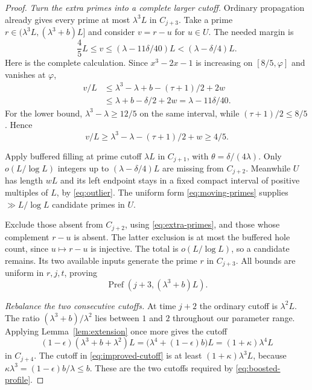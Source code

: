 \documentclass[11pt,letterpaper]{article}
\numberwithin{equation}{section}
\theoremstyle{definition}
\theoremstyle{remark}
\DeclareMathOperator{\Pref}{Pref}
\newcommand{\ph}{\varphi}
\begin{document}
\begin{proof}
\emph{Turn the extra primes into a complete larger cutoff.}
Ordinary propagation already gives every prime at most $\lambda^3L$
in $C_{j+3}$. Take a prime
$r\in(\lambda^3L,(\lambda^3+b)L]$ and consider $v=r-u$ for $u\in U$.
The needed margin is
\begin{equation}\label{eq:complement-margin}
 \frac45L\le v\le(\lambda-11\delta/40)L
       <(\lambda-\delta/4)L.
\end{equation}
Here is the complete calculation. Since $x^3-2x-1$ is increasing on
$[8/5,\ph]$ and vanishes at $\ph$,
\begin{align*}
 v/L
 &\le\lambda^3-\lambda+b-(\tau+1)/2+2w\\
 &\le\lambda+b-\delta/2+2w
 =\lambda-11\delta/40.
\end{align*}
For the lower bound, $\lambda^3-\lambda\ge12/5$ on the same interval,
while $(\tau+1)/2\le8/5$. Hence
\[
 v/L\ge\lambda^3-\lambda-(\tau+1)/2+w\ge4/5.
\]

Apply buffered filling at prime cutoff $\lambda L$ in $C_{j+1}$, with
$\theta=\delta/(4\lambda)$. Only $o(L/\log L)$ integers up to
$(\lambda-\delta/4)L$ are missing from $C_{j+2}$.
Meanwhile $U$ has length $wL$ and its left endpoint stays in a fixed
compact interval of positive multiples of $L$, by \eqref{eq:outlier}.
The uniform form \eqref{eq:moving-primes} supplies $\gg L/\log L$
candidate primes in $U$.

Exclude those absent from $C_{j+2}$, using \eqref{eq:extra-primes}, and
those whose complement $r-u$ is absent. The latter exclusion is at most
the buffered hole count, since $u\mapsto r-u$ is injective.
The total is $o(L/\log L)$, so a candidate remains. Its two available
inputs generate the prime $r$ in $C_{j+3}$. All bounds are uniform in
$r,j,t$, proving
\begin{equation}\label{eq:improved-cutoff}
 \Pref(j+3,(\lambda^3+b)L).
\end{equation}

\emph{Rebalance the two consecutive cutoffs.}
At time $j+2$ the ordinary cutoff is $\lambda^2L$. The ratio
$(\lambda^3+b)/\lambda^2$ lies between $1$ and $2$ throughout our
parameter range. Applying Lemma~\ref{lem:extension} once more gives
the cutoff
\[
 (1-\epsilon)(\lambda^3+b+\lambda^2)L
 =\bigl(\lambda^4+(1-\epsilon)b\bigr)L
 =(1+\kappa)\lambda^4L
\]
in $C_{j+4}$. The cutoff in \eqref{eq:improved-cutoff} is at least
$(1+\kappa)\lambda^3L$, because
$\kappa\lambda^3=(1-\epsilon)b/\lambda\le b$.
These are the two cutoffs required by \eqref{eq:boosted-profile}.
\end{proof}
\end{document}
